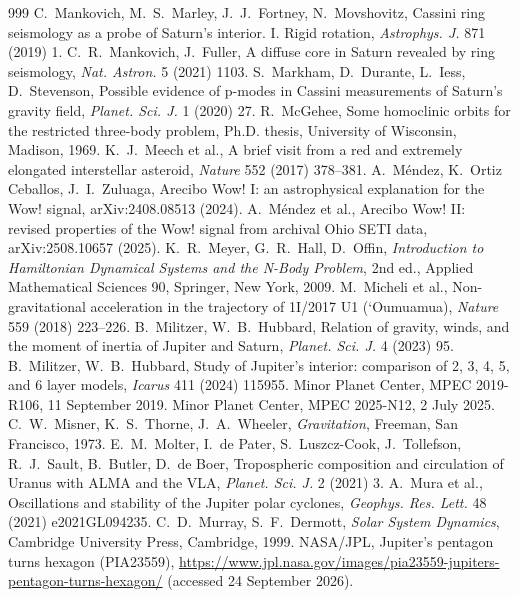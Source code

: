 \documentclass[11pt]{article}
\theoremstyle{definition}\newtheorem{definition}[theorem]{Definition}
\theoremstyle{remark}\newtheorem{remark}[theorem]{Remark}
\begin{document}
\begin{thebibliography}{999}
 C.~Mankovich, M.~S.~Marley, J.~J.~Fortney, N.~Movshovitz, Cassini ring seismology as a probe of Saturn's interior. I. Rigid rotation, \emph{Astrophys. J.} 871 (2019) 1.
 C.~R.~Mankovich, J.~Fuller, A diffuse core in Saturn revealed by ring seismology, \emph{Nat. Astron.} 5 (2021) 1103.
 S.~Markham, D.~Durante, L.~Iess, D.~Stevenson, Possible evidence of p-modes in Cassini measurements of Saturn's gravity field, \emph{Planet. Sci. J.} 1 (2020) 27.
 R.~McGehee, Some homoclinic orbits for the restricted three-body problem, Ph.D. thesis, University of Wisconsin, Madison, 1969.
 K.~J.~Meech et al., A brief visit from a red and extremely elongated interstellar asteroid, \emph{Nature} 552 (2017) 378--381.
 A.~M\'endez, K.~Ortiz Ceballos, J.~I.~Zuluaga, Arecibo Wow! I: an astrophysical explanation for the Wow! signal, arXiv:2408.08513 (2024).
 A.~M\'endez et al., Arecibo Wow! II: revised properties of the Wow! signal from archival Ohio SETI data, arXiv:2508.10657 (2025).
 K.~R.~Meyer, G.~R.~Hall, D.~Offin, \emph{Introduction to Hamiltonian Dynamical Systems and the N-Body Problem}, 2nd ed., Applied Mathematical Sciences 90, Springer, New York, 2009.
 M.~Micheli et al., Non-gravitational acceleration in the trajectory of 1I/2017 U1 (\textquoteleft Oumuamua), \emph{Nature} 559 (2018) 223--226.
 B.~Militzer, W.~B.~Hubbard, Relation of gravity, winds, and the moment of inertia of Jupiter and Saturn, \emph{Planet. Sci. J.} 4 (2023) 95.
 B.~Militzer, W.~B.~Hubbard, Study of Jupiter's interior: comparison of 2, 3, 4, 5, and 6 layer models, \emph{Icarus} 411 (2024) 115955.
 Minor Planet Center, MPEC 2019-R106, 11 September 2019.
 Minor Planet Center, MPEC 2025-N12, 2 July 2025.
 C.~W.~Misner, K.~S.~Thorne, J.~A.~Wheeler, \emph{Gravitation}, Freeman, San Francisco, 1973.
 E.~M.~Molter, I.~de Pater, S.~Luszcz-Cook, J.~Tollefson, R.~J.~Sault, B.~Butler, D.~de Boer, Tropospheric composition and circulation of Uranus with ALMA and the VLA, \emph{Planet. Sci. J.} 2 (2021) 3.
 A.~Mura et al., Oscillations and stability of the Jupiter polar cyclones, \emph{Geophys. Res. Lett.} 48 (2021) e2021GL094235.
 C.~D.~Murray, S.~F.~Dermott, \emph{Solar System Dynamics}, Cambridge University Press, Cambridge, 1999.
 NASA/JPL, Jupiter's pentagon turns hexagon (PIA23559), \url{https://www.jpl.nasa.gov/images/pia23559-jupiters-pentagon-turns-hexagon/} (accessed 24 September 2026).

\end{thebibliography}
\end{document}
